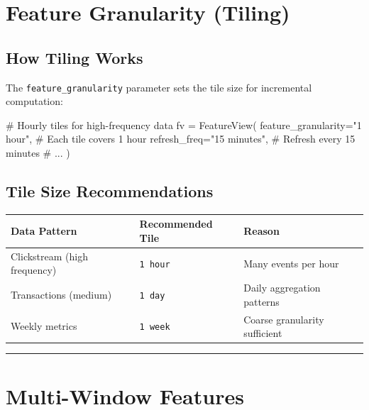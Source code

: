 \documentclass[
  letterpaper,
  DIV=11,
  numbers=noendperiod]{scrreprt}
\newenvironment{Shaded}{\begin{snugshade}}{\end{snugshade}}
\newcommand{\CommentTok}[1]{\textcolor[rgb]{0.37,0.37,0.37}{#1}}
\newcommand{\NormalTok}[1]{\textcolor[rgb]{0.00,0.23,0.31}{#1}}
\newcommand{\OperatorTok}[1]{\textcolor[rgb]{0.37,0.37,0.37}{#1}}
\newcommand{\StringTok}[1]{\textcolor[rgb]{0.13,0.47,0.30}{#1}}
\begin{document}
\hypertarget{sec-tiling}{%
\section{Feature Granularity (Tiling)}\label{sec-tiling}}

\hypertarget{how-tiling-works}{%
\subsection{How Tiling Works}\label{how-tiling-works}}

The \texttt{feature\_granularity} parameter sets the tile size for
incremental computation:

\begin{Shaded}
\begin{Highlighting}[]
\CommentTok{\# Hourly tiles for high{-}frequency data}
\NormalTok{fv }\OperatorTok{=}\NormalTok{ FeatureView(}
\NormalTok{    feature\_granularity}\OperatorTok{=}\StringTok{"1 hour"}\NormalTok{,  }\CommentTok{\# Each tile covers 1 hour}
\NormalTok{    refresh\_freq}\OperatorTok{=}\StringTok{"15 minutes"}\NormalTok{,      }\CommentTok{\# Refresh every 15 minutes}
    \CommentTok{\# ...}
\NormalTok{)}
\end{Highlighting}
\end{Shaded}

\hypertarget{tile-size-recommendations}{%
\subsection{Tile Size Recommendations}\label{tile-size-recommendations}}

\begin{longtable}[]{@{}lll@{}}
\toprule\noalign{}
Data Pattern & Recommended Tile & Reason \\
\midrule\noalign{}
\endhead
\bottomrule\noalign{}
\endlastfoot
Clickstream (high frequency) & \texttt{1\ hour} & Many events per
hour \\
Transactions (medium) & \texttt{1\ day} & Daily aggregation patterns \\
Weekly metrics & \texttt{1\ week} & Coarse granularity sufficient \\
\end{longtable}

\begin{center}\rule{0.5\linewidth}{0.5pt}\end{center}

\hypertarget{multi-window-features}{%
\section{Multi-Window Features}\label{multi-window-features}}
\end{document}
